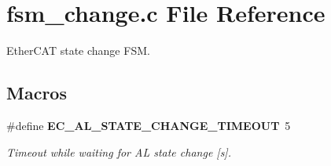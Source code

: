 \section{fsm\-\_\-change.\-c File Reference}
\label{fsm__change_8c}


Ether\-C\-A\-T state change F\-S\-M.  


\subsection*{Macros}
\begin{DoxyCompactItemize}
\item 
\#define {\bf E\-C\-\_\-\-A\-L\-\_\-\-S\-T\-A\-T\-E\-\_\-\-C\-H\-A\-N\-G\-E\-\_\-\-T\-I\-M\-E\-O\-U\-T}~5\label{fsm__change_8c_ac795cfc1b59ef531b45e8d14ecab9841}

\begin{DoxyCompactList}\small\item\em Timeout while waiting for A\-L state change [s]. \end{DoxyCompactList}\end{DoxyCompactItemize}
